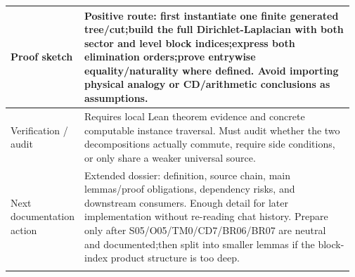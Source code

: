 \begin{longtable}{L{0.16\linewidth} L{0.81\linewidth}}
\hline\addlinespace[0.20em]
Proof sketch & Positive route: first instantiate one finite generated tree/\allowbreak{}cut;\newline build the full Dirichlet-Laplacian with both sector and level block indices;\newline express both elimination orders;\newline prove entrywise equality/\allowbreak{}naturality where defined. Avoid importing physical analogy or CD/\allowbreak{}arithmetic conclusions as assumptions.\\
\hline\addlinespace[0.20em]
Verification /\allowbreak{} audit & Requires local Lean theorem evidence and concrete computable instance traversal. Must audit whether the two decompositions actually commute, require side conditions, or only share a weaker universal source.\\
\hline\addlinespace[0.20em]
Next documentation action & Extended dossier: definition, source chain, main lemmas/\allowbreak{}proof obligations, dependency risks, and downstream consumers. Enough detail for later implementation without re-reading chat history. Prepare only after S05/\allowbreak{}O05/\allowbreak{}TM0/\allowbreak{}CD7/\allowbreak{}BR06/\allowbreak{}BR07 are neutral and documented;\newline then split into smaller lemmas if the block-index product structure is too deep.\\
\hline\addlinespace[0.20em]
\end{longtable}
